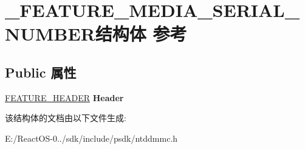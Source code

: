 \hypertarget{struct___f_e_a_t_u_r_e___m_e_d_i_a___s_e_r_i_a_l___n_u_m_b_e_r}{}\section{\+\_\+\+F\+E\+A\+T\+U\+R\+E\+\_\+\+M\+E\+D\+I\+A\+\_\+\+S\+E\+R\+I\+A\+L\+\_\+\+N\+U\+M\+B\+E\+R结构体 参考}
\label{struct___f_e_a_t_u_r_e___m_e_d_i_a___s_e_r_i_a_l___n_u_m_b_e_r}
\subsection*{Public 属性}
\begin{DoxyCompactItemize}
\item 
\mbox{\label{struct___f_e_a_t_u_r_e___m_e_d_i_a___s_e_r_i_a_l___n_u_m_b_e_r_a551a6acefc11ab3c4a6119f805c16202}} 
\hyperlink{struct___f_e_a_t_u_r_e___h_e_a_d_e_r}{F\+E\+A\+T\+U\+R\+E\+\_\+\+H\+E\+A\+D\+ER} {\bfseries Header}
\end{DoxyCompactItemize}


该结构体的文档由以下文件生成\+:\begin{DoxyCompactItemize}
\item 
E\+:/\+React\+O\+S-\/0../sdk/include/psdk/ntddmmc.\+h\end{DoxyCompactItemize}
